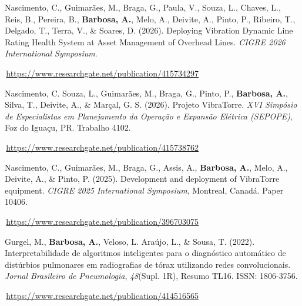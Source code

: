 \newcommand{\cvpublicationlink}[1]{%
  \par
  \textcolor{MarkerColour!80!black}{\scriptsize\faLink}\,\url{#1}%
}
\begin{list}{}{%
  \setlength{\leftmargin}{2.5em}%
  \setlength{\labelwidth}{2.5em}%
  \setlength{\labelsep}{0pt}%
  \setlength{\itemsep}{1.5ex}%
  \setlength{\parsep}{0pt}%
}

\item[{\makebox[2.5em][l]{\circled{1}}}]
Nascimento, C., Guimarães, M., Braga, G., Paula, V., Souza, L.,
Chaves, L., Reis, B., Pereira, B., \textbf{Barbosa, A.},
Melo, A., Deivite, A., Pinto, P., Ribeiro, T., Delgado, T.,
Terra, V., \& Soares, D. (2026).
Deploying Vibration Dynamic Line Rating Health System at Asset
Management of Overhead Lines.
\emph{CIGRE 2026 International Symposium}.
\cvpublicationlink{https://www.researchgate.net/publication/415734297}

\cvdivider

\item[{\makebox[2.5em][l]{\circled{2}}}]
Nascimento, C.  Souza, L., Guimarães, M.,
Braga, G., Pinto, P.,
\textbf{Barbosa, A.}, Silva, T.,
Deivite, A., \& Marçal, G. S. (2026).
Projeto VibraTorre.
\emph{XVI Simpósio de Especialistas em Planejamento
da Operação e Expansão Elétrica (SEPOPE)},
Foz do Iguaçu, PR. Trabalho 4102.
\cvpublicationlink{https://www.researchgate.net/publication/415738762}

\cvdivider

\item[{\makebox[2.5em][l]{\circled{3}}}]
Nascimento, C., Guimarães, M., Braga, G., Assis, A.,
\textbf{Barbosa, A.}, Melo, A., Deivite, A., \& Pinto, P. (2025).
Development and deployment of VibraTorre equipment.
\emph{CIGRE 2025 International Symposium},
Montreal, Canadá. Paper 10406.
\cvpublicationlink{https://www.researchgate.net/publication/396703075}

\cvdivider

\item[{\makebox[2.5em][l]{\circled{4}}}]
Gurgel, M.,
\textbf{Barbosa, A.},
Veloso, L.  Araújo, L.,
\& Sousa, T. (2022).
Interpretabilidade de algoritmos inteligentes
para o diagnóstico automático de distúrbios
pulmonares em radiografias de tórax
utilizando redes convolucionais.
\emph{Jornal Brasileiro de Pneumologia},
\emph{48}(Supl. 1R), Resumo TL16. ISSN: 1806-3756.
\cvpublicationlink{https://www.researchgate.net/publication/414516565}


\end{list}

